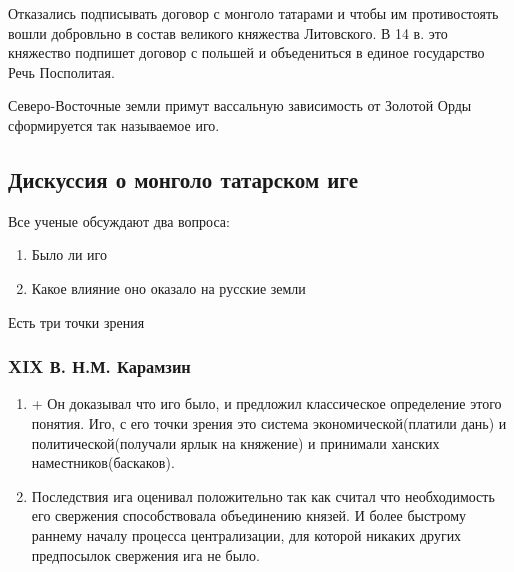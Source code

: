 \documentclass[a4paper]{article}
\begin{document}
Отказались подписывать договор с монголо татарами и чтобы им противостоять вошли добровльно в состав великого княжества Литовского.
В 14 в. это княжество подпишет договор с польшей и объедениться в единое государство Речь Посполитая.

Северо-Восточные земли примут вассальную зависимость от Золотой Орды сформируется так называемое иго.

\subsection{Дискуссия о монголо татарском иге}
Все ученые обсуждают два вопроса:
\begin{enumerate}
    \item Было ли иго
    \item Какое влияние оно оказало на русские земли
\end{enumerate}

Есть три точки зрения

\subsubsection{XIX В. Н.М. Карамзин}
\begin{enumerate}
    \item +
    Он доказывал что иго было, и предложил классическое определение этого понятия.
    Иго, с его точки зрения это система экономической(платили дань) и политической(получали ярлык на княжение) и принимали ханских наместников(баскаков).
    \item Последствия ига оценивал положительно так как считал что необходимость его свержения способствовала объединению князей. И более быстрому раннему началу процесса централизации, для которой никаких других предпосылок свержения ига не было.
\end{enumerate}
\end{document}
